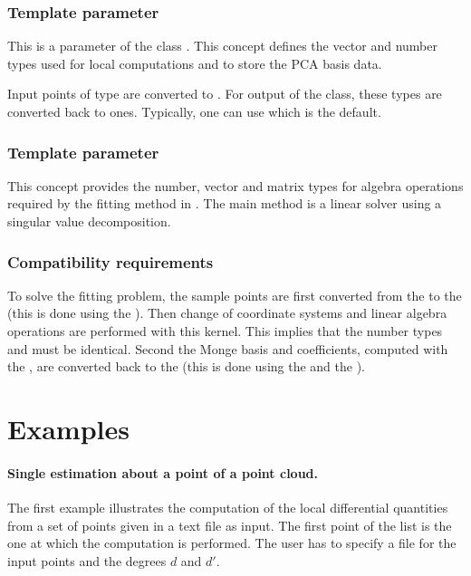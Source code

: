 \subsubsection{Template parameter }
This is a parameter of the class 
. 
This concept defines the vector and number types used for local
computations and to store the PCA basis data.  

Input points of type
 are converted to
. For output of the  class,
these types are converted back to  ones.  Typically,
one can use
 which is the default.

\subsubsection{Template parameter }

This concept provides the number, vector and matrix types for algebra
operations required by the fitting method in
. The main method is a linear solver using a singular value decomposition.

\subsubsection{Compatibility requirements}

To solve the fitting problem, the sample points are first converted
from the  to the  (this is done using
the ). Then change of coordinate
systems and linear algebra operations are performed with this
kernel. This implies that the number types  and
 must be identical.
Second the Monge basis and coefficients, computed with the
, are converted back to the  
(this is done using the  and the
).


\section{Examples} 

\paragraph{Single estimation about a point of a point cloud.}
The first example illustrates the computation of the local
differential quantities from a set of points given in a text file as
input. The first point of the list is the one at which the computation
is performed. The user has to specify a file for the input points and
the degrees $d$ and $d'$.

